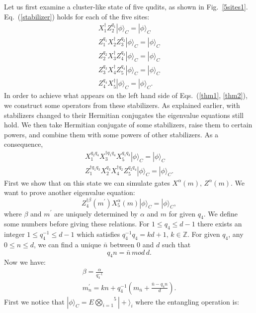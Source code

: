 \documentclass[aps,amsfonts,pra,twocolumn,showpacs]{revtex4-1}
\newcommand{\be}{\begin{equation}}
\newcommand{\ee}{\end{equation}}
\begin{document}
	Let us first examine a cluster-like state of five qudits, as shown in Fig.~\ref{5sites1}. Eq.~(\ref{stabilizer}) holds for each of the five sites:
		\begin{align}
		X_1^\dagger Z_2^{q_1} |\phi\rangle_C = |\phi\rangle_C \\
		Z_1^{q_1} X_2^\dagger Z_3^{q_2} |\phi\rangle_C = |\phi\rangle_C \\
		Z_2^{q_2} X_3^\dagger Z_4^{q_3} |\phi\rangle_C = |\phi\rangle_C \\
		Z_3^{q_3} X_4^\dagger Z_5^{q_4} |\phi\rangle_C = |\phi\rangle_C \\
		Z_4^{q_4} X_5^\dagger |\phi\rangle_C = |\phi\rangle_C.
		\end{align}
	In order to achieve what appears on the left hand side of Eqs.~(\ref{thm1}, \ref{thm2}), we construct some operators from these stabilizers. As explained earlier, with stabilizers changed to their Hermitian conjugates the eigenvalue equations still hold. We then take Hermitian conjugate of some stabilizers, raise them to certain powers, and combine them with some powers of other stabilizers. As a consequence,
		\begin{align}
		X_1^{q_2q_4} X_3^{\dagger q_1q_4} X_5^{q_1q_3} |\phi\rangle_C = |\phi\rangle_C \label{5site1} \\
		Z_1^{\dagger q_1q_3} X_2^{q_3} X_4^{\dagger q_2} Z_5^{q_2q_4} |\phi\rangle_C = |\phi\rangle_C \label{5site2}.
		\end{align}
	First we show that on this state we can simulate gates $X^\alpha(m), \, Z^\alpha(m)$. We want to prove another eigenvalue equation:
		\be
		Z_4^{\dagger\beta}(m^\prime) X_5^\alpha(m) |\phi\rangle_C = |\phi\rangle_C,
		\label{phase}
		\ee
	where $\beta$ and $m^\prime$ are uniquely determined by $\alpha$ and $m$ for given $q_4$. We define some numbers before giving these relations. For $1 \leq q_4 \leq d-1$ there exists an integer $1 \leq q_4^{-1} \leq d-1$ which satisfies $q_4^{-1}q_4=kd+1, \, k \in \mathds{Z}$. For given $q_4$, any $0 \leq n \leq d$, we can find a unique $\bar{n}$ between 0 and $d$ such that
		\be
		q_4n=\bar{n} \, mod \, d \label{bar}.
		\ee
	Now we have:
		\begin{align}
		\beta=\frac{\alpha}{q_4^{-1}} \label{beta} \\
		m^\prime_n = kn + q_4^{-1}(m_{\bar{n}}+\frac{\bar{n}-q_4n}{d}) \label{m_prime}.
		\end{align}
		First we notice that $|\phi\rangle_C = E \overset{5}{\underset{i=1}{\bigotimes}} |+\rangle_i$ where the entangling operation is:
\end{document}
